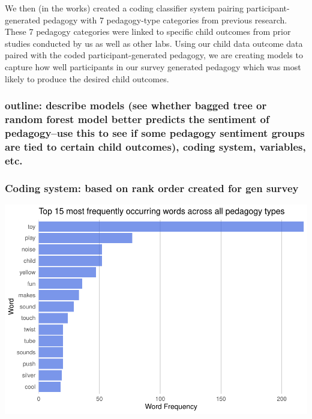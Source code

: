 \documentclass[
  english,
  man]{apa6}
\begin{document}
We then (in the works) created a coding classifier system pairing participant-generated pedagogy with 7 pedagogy-type categories from previous research. These 7 pedagogy categories were linked to specific child outcomes from prior studies conducted by us as well as other labs. Using our child data outcome data paired with the coded participant-generated pedagogy, we are creating models to capture how well participants in our survey generated pedagogy which was most likely to produce the desired child outcomes.

\hypertarget{outline-describe-models-see-whether-bagged-tree-or-random-forest-model-better-predicts-the-sentiment-of-pedagogyuse-this-to-see-if-some-pedagogy-sentiment-groups-are-tied-to-certain-child-outcomes-coding-system-variables-etc.}{%
\subsubsection{outline: describe models (see whether bagged tree or random forest model better predicts the sentiment of pedagogy--use this to see if some pedagogy sentiment groups are tied to certain child outcomes), coding system, variables, etc.}\label{outline-describe-models-see-whether-bagged-tree-or-random-forest-model-better-predicts-the-sentiment-of-pedagogyuse-this-to-see-if-some-pedagogy-sentiment-groups-are-tied-to-certain-child-outcomes-coding-system-variables-etc.}}

\hypertarget{coding-system-based-on-rank-order-created-for-gen-survey}{%
\subsubsection{Coding system: based on rank order created for gen survey}\label{coding-system-based-on-rank-order-created-for-gen-survey}}

\includegraphics{capstone640_files/figure-latex/initial plots-1.pdf}
\end{document}
